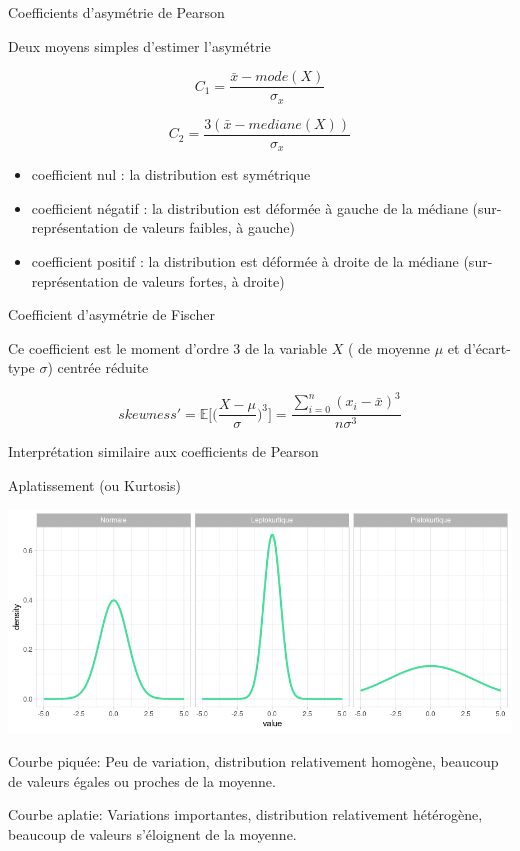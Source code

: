 \documentclass{beamer}
\begin{document}
\begin{frame}{Coefficients d'asymétrie de Pearson}


Deux moyens simples d'estimer l'asymétrie 

$$ C_1 = \frac{\bar{x} - mode(X)}{\sigma_x}$$

$$ C_2 = \frac{3(\bar{x} - mediane(X))}{\sigma_x}$$

\begin{itemize}
  \item coefficient \alert{nul} :  la distribution est \alert{symétrique}
  \item coefficient \alert{négatif} : la distribution est \alert{déformée à gauche} de la médiane (sur-représentation de valeurs faibles, à gauche)
  \item coefficient \alert{positif} :  la distribution est \alert{déformée à droite} de la médiane (sur-représentation de valeurs fortes, à droite)
\end{itemize}


\end{frame}


\begin{frame}{ Coefficient d'asymétrie de Fischer}


Ce coefficient est le moment  d'ordre 3  de la variable $X$ ( de moyenne $\mu$ et d'écart-type $\sigma$) \alert{centrée réduite}

$$skewness'=\mathbb{E}\bigg[\bigg(\frac{X-\mu}{\sigma}\bigg)^3\bigg]=\frac{\sum_{i=0}^{n} (x_i - \bar{x})^3}{n\sigma^3}$$


Interprétation similaire aux coefficients de Pearson  




\end{frame}




\begin{frame}{Aplatissement  (ou \alert{Kurtosis})}


\begin{center}
\includegraphics[width=\linewidth]{img/aplatissement.png}
\end{center}

Courbe piquée: Peu de variation, distribution relativement homogène, beaucoup de valeurs égales ou proches de la moyenne.

Courbe aplatie: Variations importantes, distribution relativement hétérogène, beaucoup de valeurs s’éloignent de la moyenne.

\end{frame}
\end{document}
